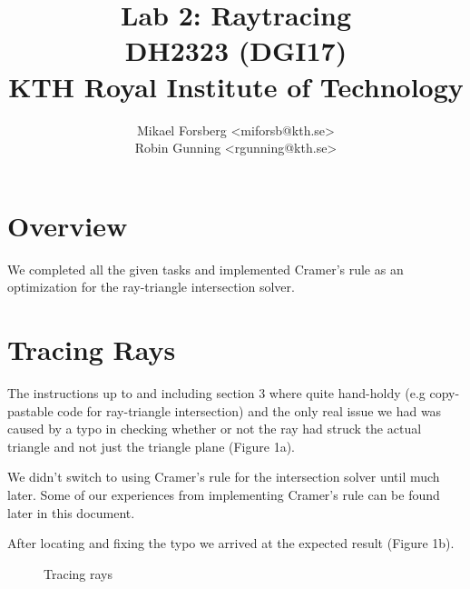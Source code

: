 \documentclass[a4paper,11pt]{article}
\begin{document}
\title{\vspace{-2cm} Lab 2: Raytracing\\ \small DH2323 (DGI17)\\ KTH Royal Institute of Technology}
\author{Mikael Forsberg <miforsb@kth.se>\\ Robin Gunning <rgunning@kth.se>}
\maketitle

\vspace{-1.25cm}

\section*{Overview}
We completed all the given tasks and implemented Cramer's rule as an
optimization for the ray-triangle intersection solver.

\section*{Tracing Rays}
The instructions up to and including section 3 where quite hand-holdy (e.g copy-pastable
code for ray-triangle intersection) and the only real issue we had was caused by a
typo in checking whether or not the ray had struck the actual triangle and not just
the triangle plane (Figure 1a).

We didn't switch to using Cramer's rule for the intersection solver until much later. Some
of our experiences from implementing Cramer's rule can be found later in this document.

After locating and fixing the typo we arrived at the expected result (Figure 1b).

\begin{figure}[H]
    \centering
    \qquad
    \caption{Tracing rays}
\end{figure}
\end{document}
